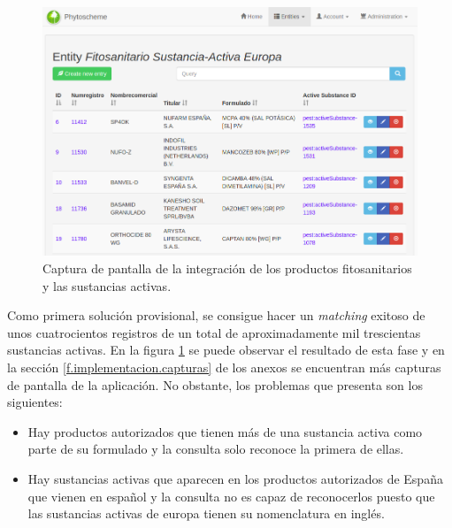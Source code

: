 \begin{figure}[!h]
    \centering
    \includegraphics[width=\textwidth,height=\textheight,keepaspectratio]{Imagenes/capturaFitSustAct}
    \caption{Captura de pantalla de la integración de  los productos fitosanitarios y las sustancias activas.}
    \label{fig:capturaFitSustAct}
\end{figure}

\par Como primera solución provisional, se consigue hacer un \textit{matching} exitoso de unos cuatrocientos registros de un total de aproximadamente mil trescientas sustancias activas. En la figura \ref{fig:capturaFitSustAct} se puede observar el resultado de esta fase y en la sección \ref{f.implementacion.capturas} de los anexos se encuentran más capturas de pantalla de la aplicación. No obstante, los problemas que presenta son los siguientes: 


\begin{itemize}
\item Hay productos autorizados que tienen más de una sustancia activa como parte de su formulado y la consulta solo reconoce la primera de ellas.
\item Hay sustancias activas que aparecen en los productos autorizados de España que vienen en español y la consulta no es capaz de reconocerlos puesto que las sustancias activas de europa tienen su nomenclatura en inglés.
\end{itemize}


\bigskip

